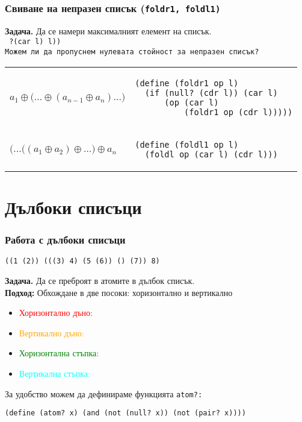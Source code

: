 \documentclass[alsotrans]{beamerswitch}
\newcommand{\hzero}{\textcolor{red}}
\newcommand{\vzero}{\textcolor{orange}}
\newcommand{\hstep}{\textcolor{green}}
\newcommand{\vstep}{\textcolor{cyan}}
\begin{document}
\begin{frame}[fragile]
  \frametitle{Свиване на непразен списък (\tt{foldr1, foldl1})}

  \textbf{Задача.} Да се намери максималният елемент на списък.\\
  \pause
  \tt{ ?{(car l)} l))}\\[2ex]
  \pause\pause
  Можем ли да пропуснем нулевата стойност за непразен списък?\\[2ex]
  \begin{tabular}{ll}
    \pause
      $a_1 \oplus \big(\ldots \oplus (a_{n-1} \oplus a_n) \ldots\big)$
    & \pause
\begin{lstlisting}
(define (foldr1 op l)
  (if (null? (cdr l)) (car l)
      (op (car l)
          (foldr1 op (cdr l)))))
\end{lstlisting}\\[6ex]
    \pause
    $\big(\ldots\big((a_1 \oplus a_2) \oplus \ldots\big) \oplus a_n$
    & \pause
\begin{lstlisting}
(define (foldl1 op l)
  (foldl op (car l) (cdr l)))
\end{lstlisting}
  \end{tabular}
\end{frame}

\section{Дълбоки списъци}

\begin{frame}[fragile]
  \frametitle{Работа с дълбоки списъци}

\begin{verbatim}
((1 (2)) (((3) 4) (5 (6)) () (7)) 8)
\end{verbatim}
  \textbf{Задача.} Да се преброят в атомите в дълбок списък.\\
  \textbf{Подход:} Обхождане в две посоки: хоризонтално и вертикално
  \pause
  \begin{itemize}[<+->]
  \item \hzero{Хоризонтално дъно:} 
  \item \vzero{Вертикално дъно:} 
  \item \hstep{Хоризонтална стъпка:} 
  \item \vstep{Вертикална стъпка:} 
  \end{itemize}
  \vspace{2ex}
  \onslide<+->
  За удобство можем да дефинираме функцията \tt{atom?}:
\begin{lstlisting}
(define (atom? x) (and (not (null? x)) (not (pair? x))))
\end{lstlisting}
\end{frame}
\end{document}
